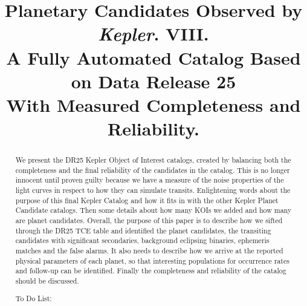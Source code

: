 \documentclass[apj,twocolappendix,numberedappendix]{emulateapj}
\renewcommand{\_}{\discretionary{\underscore}{}{\underscore}}  %
\newcommand\Kepler{\textit{Kepler}}
\begin{document}

\title{Planetary Candidates Observed by \Kepler. VIII.\\
A Fully Automated Catalog Based on Data Release 25\\With Measured Completeness and Reliability. }



\begin{abstract}
We present the DR25 Kepler Object of Interest catalogs, created by balancing both the completeness and the final reliability of the candidates in the catalog. This is no longer innocent until proven guilty because we have a measure of the noise properties of the light curves in respect to how they can simulate transits.
Enlightening words about the purpose of this final Kepler Catalog and how it fits in with the other Kepler Planet Candidate catalogs. Then some details about how many KOIs we added and how many are planet candidates. 
Overall, the purpose of this paper is to describe how we sifted through the DR25 TCE table and identified the planet candidates, the transiting candidates with significant secondaries, background eclipsing binaries, ephemeris matches and the false alarms. It also needs to describe how we arrive at the reported physical parameters of each planet, so that interesting populations for occurrence rates and follow-up can be identified.  Finally the completeness and reliability of the catalog should be discussed.

To Do List:
\begin{itemize}


\end{itemize}
\end{abstract}
\end{document}
